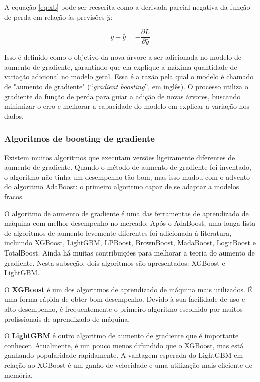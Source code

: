 A equação \eqref{eq:xb} pode ser reescrita como a derivada parcial negativa da função de perda em relação às previsões $\hat{y}$:

\begin{equation}
	y-\hat{y} = -\frac{\partial L}{\partial \hat{y}} \label{eq:xb2}
\end{equation}

Isso é definido como o objetivo da nova árvore a ser adicionada no modelo de aumento de gradiente, garantindo que ela explique a máxima quantidade de variação adicional no modelo geral. Essa é a razão pela qual o modelo é chamado de "aumento de gradiente" (``\textit{gradient boosting}'', em inglês). O processo utiliza o gradiente da função de perda para guiar a adição de novas árvores, buscando minimizar o erro e melhorar a capacidade do modelo em explicar a variação nos dados.

\subsubsection{Algoritmos de boosting de gradiente}

Existem muitos algoritmos que executam versões ligeiramente diferentes de aumento de gradiente. Quando o método de aumento de gradiente foi inventado, o algoritmo não tinha um desempenho tão bom, mas isso mudou com o advento do algoritmo AdaBoost: o primeiro algoritmo capaz de se adaptar a modelos fracos.

O algoritmo de aumento de gradiente é uma das ferramentas de aprendizado de máquina com melhor desempenho no mercado. Após o AdaBoost, uma longa lista de algoritmos de aumento levemente diferentes foi adicionada à literatura, incluindo XGBoost, LightGBM, LPBoost, BrownBoost, MadaBoost, LogitBoost e TotalBoost. Ainda há muitas contribuições para melhorar a teoria do aumento de gradiente. Nesta subseção, dois algoritmos são apresentados: XGBoost e LightGBM.

O \textbf{XGBoost} é um dos algoritmos de aprendizado de máquina mais utilizados. É uma forma rápida de obter bom desempenho. Devido à sua facilidade de uso e alto desempenho, é frequentemente o primeiro algoritmo escolhido por muitos profissionais de aprendizado de máquina.

O \textbf{LightGBM} é outro algoritmo de aumento de gradiente que é importante conhecer. Atualmente, é um pouco menos difundido que o XGBoost, mas está ganhando popularidade rapidamente. A vantagem esperada do LightGBM em relação ao XGBoost é um ganho de velocidade e uma utilização mais eficiente de memória.

